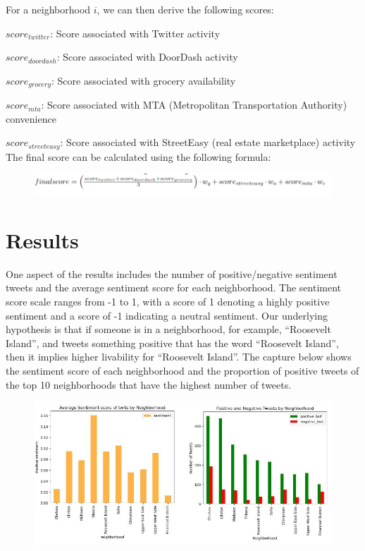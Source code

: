 \documentclass{article}
\begin{document}
For a neighborhood $i$, we can then derive the following scores:

$score_{twitter}$: Score associated with Twitter activity

$score_{doordash}$: Score associated with DoorDash activity

$score_{grocery}$: Score associated with grocery availability

$score_{mta}$: Score associated with MTA (Metropolitan Transportation Authority) convenience

$score_{streeteasy}$: Score associated with StreetEasy (real estate marketplace) activity\\
The final score can be calculated using the following formula:\\

\begin{figure}[h]
\centering
\includegraphics[scale=0.6]{picpuic.png}
\end{figure}


\section{Results}
One aspect of the results includes the number of positive/negative sentiment tweets and the average sentiment score for each neighborhood. The sentiment score scale ranges from -1 to 1, with a score of 1 denoting a highly positive sentiment and a score of -1 indicating a neutral sentiment. Our underlying hypothesis is that if someone is in a neighborhood, for example, “Roosevelt Island”, and tweets something positive that has the word “Roosevelt Island”, then it implies higher livability for “Roosevelt Island”. The capture below shows the sentiment score of each neighborhood and the proportion of positive tweets of the top 10 neighborhoods that have the highest number of tweets.

\begin{figure}[h]
\centering
\includegraphics[scale=0.50]{init_twitter.JPG}
\end{figure}
\end{document}
